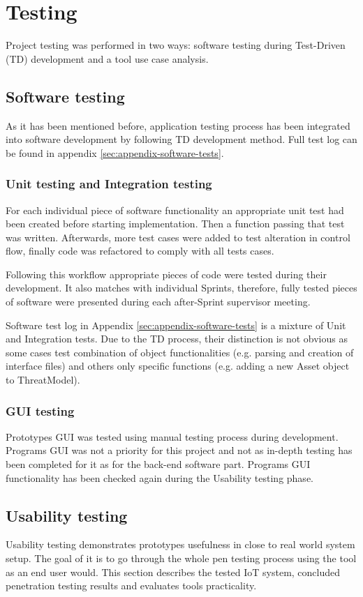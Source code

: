 \section{Testing}\label{testing}
Project testing was performed in two ways: software testing during Test-Driven (TD) development and a tool use case analysis. 

\subsection{Software testing}
	As it has been mentioned before, application testing process has been integrated into software development by following TD development method. Full test log can be found in appendix \ref{sec:appendix-software-tests}.

	\subsubsection{Unit testing and Integration testing}
	For each individual piece of software functionality an appropriate unit test had been created before starting implementation. Then a function passing that test was written. Afterwards, more test cases were added to test alteration in control flow, finally code was refactored to comply with all tests cases.
	
	Following this workflow appropriate pieces of code were tested during their development. It also matches with individual Sprints, therefore, fully tested pieces of software were presented during each after-Sprint supervisor meeting.
	
	Software test log in Appendix \ref{sec:appendix-software-tests} is a mixture of Unit and Integration tests. Due to the TD process, their distinction is not obvious as some cases test combination of object functionalities (e.g. parsing and creation of interface files) and others only specific functions (e.g. adding a new Asset object to ThreatModel).


	\subsubsection{GUI testing}
	Prototypes GUI was tested using manual testing process during development. Programs GUI was not a priority for this project and not as in-depth testing has been completed for it as for the back-end software part. Programs GUI functionality has been checked again during the Usability testing phase.


\subsection{Usability testing}
	Usability testing demonstrates prototypes usefulness in close to real world system setup. The goal of it is to go through the whole pen testing process using the tool as an end user would. This section describes the tested IoT system, concluded penetration testing results and evaluates tools practicality.
	
